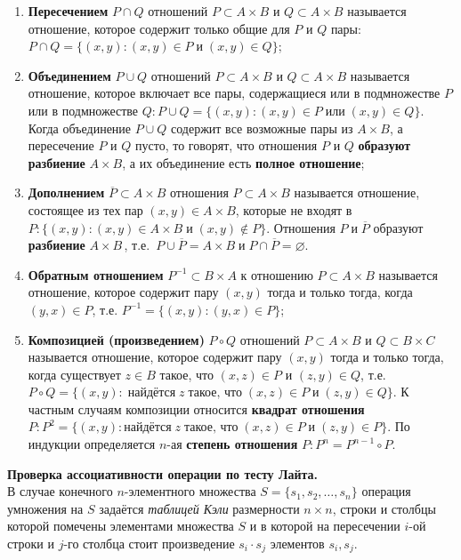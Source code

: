 \documentclass[spec, och, otchet, hidelinks]{SCWorks}
\newcommand{\tbf}[1]{\textbf{#1}}
\begin{document}
\begin{enumerate}
\item \tbf{Пересечением} $P \cap Q$ отношений $P \subset A \times B$ и $Q \subset
  A \times B$ называется отношение, которое
  содержит только общие для $P$ и $Q$ пары: $P \cap Q = \{(x,
  y): (x, y) \in P \; \text{и} \; (x, y) \in Q\}$;
\item \tbf{Объединением} $P \cup Q$ отношений $P \subset A \times B$ и $Q
  \subset A \times B$ называется отношение, которое
  включает все пары, содержащиеся или в подмножестве $P$ или в подмножестве
  $Q: P \cup Q = \{(x, y): (x, y) \in P \; \text{или} \; (x, y) \in Q\}$.
  Когда объединение $P \cup Q$ содержит все возможные пары из $A \times B$, а
  пересечение $P$ и $Q$ пусто, то говорят, что отношения $P$ и $Q$
  \tbf{образуют разбиение} $A \times B$, а их объединение есть \tbf{полное
    отношение};
\item \tbf{Дополнением} $\overline P \subset A \times B$ отношения $P \subset A
  \times B$ называется отношение, состоящее из тех
  пар $(x, y) \in A \times B$, которые не входят в $P: \{(x, y): (x, y) \in
  A \times B \; \text{и} \; (x, y) \notin P\}$. Отношения $P \; \text{и} \;
  \overline P$ образуют \tbf{разбиение} $A \times B \, $, т.е. $\,P \cup \overline
  P = A \times B \; \text{и} \; P \cap \overline P = \varnothing$.
\item \tbf{Обратным отношением} $P^{-1} \subset B \times A$ к отношению $P
  \subset A \times B$ называется
  отношение, которое содержит пару $(x, y)$ тогда и только тогда, когда $(y,
  x) \in P$, т.е. $P^{-1} = \{(x, y): (y, x) \in P\}$;
\item \tbf{Композицией (произведением)} $P \circ Q$ отношений $P \subset A
  \times B$ и $Q \subset B \times C$
  называется отношение, которое содержит пару $(x, y)$ тогда и только тогда,
  когда существует $z \in B$ такое, что $(x, z) \in P$ и $(z, y) \in Q$,
  т.е. $P \circ Q = \{(x, y): \; \text{найдётся} \; z \; \text{такое, что}
  \; (x, z) \in P \; \text{и} \; (z, y) \in Q\}$. К частным случаям
  композиции относится \tbf{квадрат отношения} $P: P^2 = \{(x, y):
  \text{найдётся} \; z \; \text{такое, что} \; (x, z) \in P \; \text{и} \; (z, y)
  \in P\}$. По индукции определяется $n$-ая \tbf{степень отношения} $P: P^n
  = P^{n - 1} \circ P $.\\
\end{enumerate}

\par \tbf{Проверка ассоциативности операции по тесту Лайта.} \\
В случае конечного $n$-элементного множества $S = \{s_1, s_2, \dots, s_n\}$
операция умножения на $S$ задаётся \textit{таблицей Кэли} размерности $n \times
n$, строки и столбцы которой помечены элементами множества $S$ и в которой на
пересечении $i$-ой строки и $j$-го столбца стоит произведение $s_i \cdot s_j$
элементов $s_i, s_j$.
\end{document}
